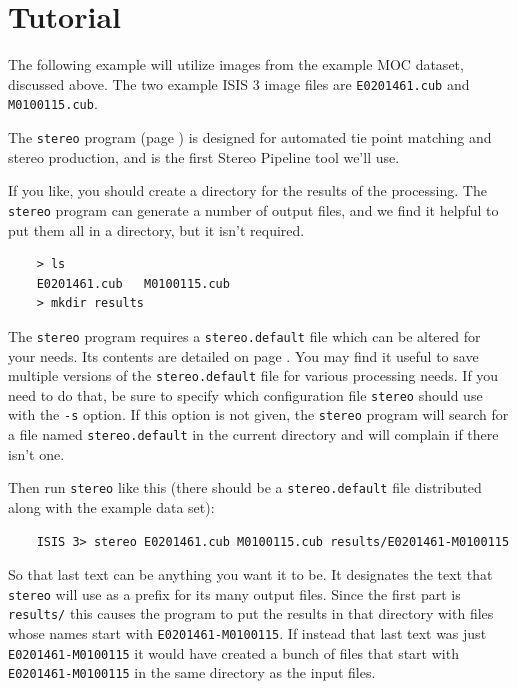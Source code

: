 \section{Tutorial}

The following example will utilize images from the example MOC
dataset, discussed above.  The two example ISIS 3 image files are
\texttt{E0201461.cub} and \texttt{M0100115.cub}.

The \texttt{stereo} program (page \pageref{stereo}) is designed for
automated tie point matching and stereo production, and is the first
Stereo Pipeline tool we'll use.

If you like, you should create a directory for the results of the
processing.  The \texttt{stereo} program can generate a number of
output files, and we find it helpful to put them all in a directory,
but it isn't required.

\begin{verbatim}
    > ls
    E0201461.cub   M0100115.cub
    > mkdir results
\end{verbatim}
\noindent
The \texttt{stereo} program requires a \texttt{stereo.default} file
which can be altered for your needs.  Its contents are detailed on
page \pageref{stereo.default}.  You may find it useful to save
multiple versions of the \texttt{stereo.default} file for various
processing needs. If you need to do that, be sure to specify which
configuration file \texttt{stereo} should use with the \texttt{-s}
option.  If this option is not given, the \texttt{stereo} program
will search for a file named \texttt{stereo.default} in the current
directory and will complain if there isn't one.

Then run \texttt{stereo} like this (there should be a
\texttt{stereo.default} file distributed along with the example
data set):

\begin{verbatim}
    ISIS 3> stereo E0201461.cub M0100115.cub results/E0201461-M0100115
\end{verbatim}
\noindent
So that last text can be anything you want it to be.  It designates
the text that \texttt{stereo} will use as a prefix for its many
output files.  Since the first part is \texttt{results/} this causes
the program to put the results in that directory with files whose
names start with \texttt{E0201461-M0100115}.  If instead that last
text was just \texttt{E0201461-M0100115} it would have created a
bunch of files that start with \texttt{E0201461-M0100115} in the
same directory as the input files.

